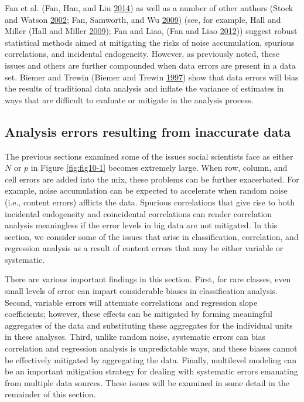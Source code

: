 \documentclass[]{krantz}
\begin{document}
Fan et al. (Fan, Han, and Liu
\protect\hyperlink{ref-fan2014challenges}{2014}) as well as a number of
other authors (Stock and Watson
\protect\hyperlink{ref-stock2002forecasting}{2002}; Fan, Samworth, and
Wu \protect\hyperlink{ref-fan2009ultrahigh}{2009}) (see, for example,
Hall and Miller (Hall and Miller
\protect\hyperlink{ref-HallMiller2009}{2009}); Fan and Liao, (Fan and
Liao \protect\hyperlink{ref-FanLiao2012}{2012})) suggest robust
statistical methods aimed at mitigating the risks of noise accumulation,
spurious correlations, and incidental endogeneity. However, as
previously noted, these issues and others are further compounded when
data errors are present in a data set. Biemer and Trewin (Biemer and
Trewin \protect\hyperlink{ref-biemer1997review}{1997}) show that data
errors will bias the results of traditional data analysis and inflate
the variance of estimates in ways that are difficult to evaluate or
mitigate in the analysis process.

\subsection{Analysis errors resulting from inaccurate
data}\label{sec:10-4.2}

The previous sections examined some of the issues social scientists face
as either \(N\) or \(p\) in Figure \ref{fig:fig10-1} becomes extremely
large. When row, column, and cell errors are added into the mix, these
problems can be further exacerbated. For example, noise accumulation can
be expected to accelerate when random noise (i.e., content errors)
afflicts the data. Spurious correlations that give rise to both
incidental endogeneity and coincidental correlations can render
correlation analysis meaningless if the error levels in big data are not
mitigated. In this section, we consider some of the issues that arise in
classification, correlation, and regression analysis as a result of
content errors that may be either variable or systematic.

There are various important findings in this section. First, for rare
classes, even small levels of error can impart considerable biases in
classification analysis. Second, variable errors will attenuate
correlations and regression slope coefficients; however, these effects
can be mitigated by forming meaningful aggregates of the data and
substituting these aggregates for the individual units in these
analyses. Third, unlike random noise, systematic errors can bias
correlation and regression analysis is unpredictable ways, and these
biases cannot be effectively mitigated by aggregating the data. Finally,
multilevel modeling can be an important mitigation strategy for dealing
with systematic errors emanating from multiple data sources. These
issues will be examined in some detail in the remainder of this section.
\end{document}
